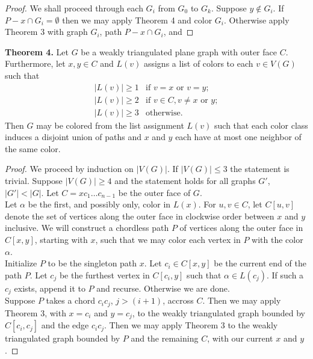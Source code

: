 \documentclass[12pt,a4paper]{article}
\begin{document}
\begin{adjustwidth}{2em}{2em}
\begin{proof}
\noindent We shall proceed through each $G_i$ from $G_0$ to $G_k$. Suppose $y\not\in G_i$.
If $P-x\cap G_i=\emptyset$ then we may apply Theorem 4 and color $G_i$. Otherwise apply Theorem 3 with graph
$G_i$, path $P-x\cap G_i$, and 


\end{proof}
\end{adjustwidth}

\begin{adjustwidth}{2em}{2em}
\noindent \textbf{Theorem 4.} Let $G$ be a weakly triangulated plane graph with outer face $C$.
Furthermore, let $x,y\in C$
and $L(v)$ assigns a list of colors to each $v\in V(G)$ such that
\[
    \begin{array}{ll}
	    |L(v)|\ge 1 & \text{if } v=x \text{ or } v=y;\\
	    |L(v)|\ge 2 & \text{if } v\in C, v\ne x \text{ or } y;\\
	    |L(v)|\ge 3 & \text{otherwise.}
    \end{array}
\]
Then $G$ may be colored from the list assignment $L(v)$ such that each color class induces a disjoint
union of paths and $x$ and $y$ each have at most one neighbor of the same color.

\begin{proof}
We proceed by induction on $|V(G)|$. If $|V(G)|\le3$ the statement is trivial. Suppose $|V(G)|\ge4$ and the
statement holds for all graphs $G'$, $|G'|<|G|$. Let $C=xc_1\ldots c_{n-1}$ be the outer face of $G$.\\

\noindent Let $\alpha$ be the first, and possibly only, color in $L(x)$. For $u,v\in C$, let $C[u,v]$ denote the set of
vertices along the outer face in clockwise order between $x$ and $y$ inclusive. We will construct a
chordless path $P$ of vertices along the outer face in $C[x,y]$,
starting with $x$, such that we may color each vertex in $P$ with the color $\alpha$.\\

\noindent Initialize $P$ to be the singleton path $x$. Let $c_i\in C[x,y]$ be the current end of the path $P$.
Let $c_j$ be the furthest vertex in $C[c_i,y]$ such that $\alpha\in L(c_j)$. If such a $c_j$ exists, append it
to $P$ and recurse. Otherwise we are done.\\

\noindent Suppose $P$ takes a chord $c_ic_j$,
$j>(i+1)$, accross $C$. Then we may apply Theorem 3, with $x=c_i$ and $y=c_j$, to the weakly triangulated graph
bounded by $C[c_i,c_j]$ and the
edge $c_ic_j$. Then we may apply Theorem 3 to the weakly triangulated
graph bounded by $P$ and the remaining $C$, with our current $x$ and $y$.
\end{proof}
\end{adjustwidth}
\end{document}
